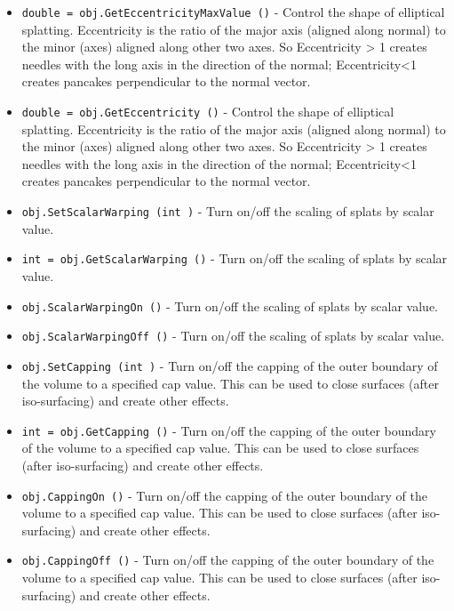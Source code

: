 \begin{itemize}
\item  \verb|double = obj.GetEccentricityMaxValue ()| -  Control the shape of elliptical splatting. Eccentricity is the ratio
 of the major axis (aligned along normal) to the minor (axes) aligned
 along other two axes. So Eccentricity > 1 creates needles with the
 long axis in the direction of the normal; Eccentricity<1 creates
 pancakes perpendicular to the normal vector.

\item  \verb|double = obj.GetEccentricity ()| -  Control the shape of elliptical splatting. Eccentricity is the ratio
 of the major axis (aligned along normal) to the minor (axes) aligned
 along other two axes. So Eccentricity > 1 creates needles with the
 long axis in the direction of the normal; Eccentricity<1 creates
 pancakes perpendicular to the normal vector.

\item  \verb|obj.SetScalarWarping (int )| -  Turn on/off the scaling of splats by scalar value.

\item  \verb|int = obj.GetScalarWarping ()| -  Turn on/off the scaling of splats by scalar value.

\item  \verb|obj.ScalarWarpingOn ()| -  Turn on/off the scaling of splats by scalar value.

\item  \verb|obj.ScalarWarpingOff ()| -  Turn on/off the scaling of splats by scalar value.

\item  \verb|obj.SetCapping (int )| -  Turn on/off the capping of the outer boundary of the volume
 to a specified cap value. This can be used to close surfaces
 (after iso-surfacing) and create other effects.

\item  \verb|int = obj.GetCapping ()| -  Turn on/off the capping of the outer boundary of the volume
 to a specified cap value. This can be used to close surfaces
 (after iso-surfacing) and create other effects.

\item  \verb|obj.CappingOn ()| -  Turn on/off the capping of the outer boundary of the volume
 to a specified cap value. This can be used to close surfaces
 (after iso-surfacing) and create other effects.

\item  \verb|obj.CappingOff ()| -  Turn on/off the capping of the outer boundary of the volume
 to a specified cap value. This can be used to close surfaces
 (after iso-surfacing) and create other effects.


\end{itemize}
